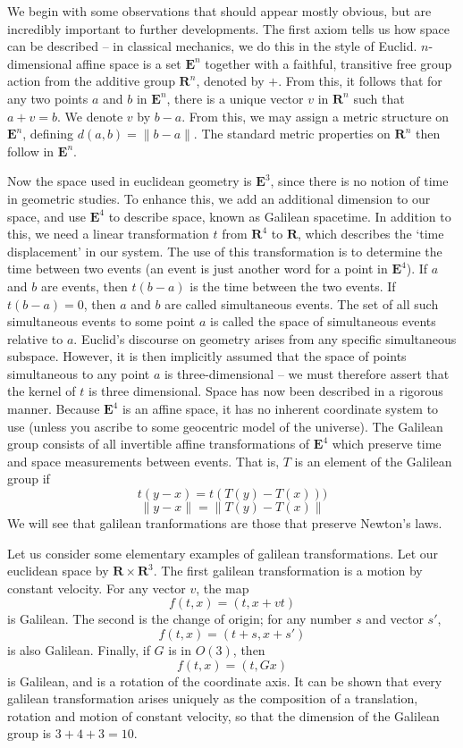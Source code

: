 We begin with some observations that should appear mostly obvious, but are incredibly important to further developments. The first axiom tells us how space can be described -- in classical mechanics, we do this in the style of Euclid. $n$-dimensional affine space is a set $\mathbf{E}^n$ together with a faithful, transitive free group action from the additive group $\mathbf{R}^n$, denoted by $+$. From this, it follows that for any two points $a$ and $b$ in $\mathbf{E}^n$, there is a unique vector $v$ in $\mathbf{R}^n$ such that $a + v = b$. We denote $v$ by $b - a$. From this, we may assign a metric structure on $\mathbf{E}^n$, defining $d(a,b) = \| b - a \|$. The standard metric properties on $\mathbf{R}^n$ then follow in $\mathbf{E}^n$.

Now the space used in euclidean geometry is $\mathbf{E}^3$, since there is no notion of time in geometric studies. To enhance this, we add an additional dimension to our space, and use $\mathbf{E}^4$ to describe space, known as Galilean spacetime. In addition to this, we need a linear transformation $t$ from $\mathbf{R}^4$ to $\mathbf{R}$, which describes the `time displacement' in our system. The use of this transformation is to determine the time between two events (an event is just another word for a point in $\mathbf{E}^4$). If $a$ and $b$ are events, then $t(b - a)$ is the time between the two events. If $t(b - a) = 0$, then $a$ and $b$ are called simultaneous events. The set of all such simultaneous events to some point $a$ is called the space of simultaneous events relative to $a$. Euclid's discourse on geometry arises from any specific simultaneous subspace. However, it is then implicitly assumed that the space of points simultaneous to any point $a$ is three-dimensional -- we must therefore assert that the kernel of $t$ is three dimensional. Space has now been described in a rigorous manner.
%
Because $\mathbf{E}^4$ is an affine space, it has no inherent coordinate system to use (unless you ascribe to some geocentric model of the universe). The Galilean group consists of all invertible affine transformations of $\mathbf{E}^4$ which preserve time and space measurements between events. That is, $T$ is an element of the Galilean group if
%
\[ t(y - x) = t(T(y) - T(x))) \]
%
\[ \| y - x \| = \| T(y) - T(x) \| \]
%
We will see that galilean tranformations are those that preserve Newton's laws.

Let us consider some elementary examples of galilean transformations. Let our euclidean space by $\mathbf{R} \times \mathbf{R}^3$. The first galilean transformation is a motion by constant velocity. For any vector $v$, the map
%
\[ f(t,x) = (t,x + vt) \]
%
is Galilean. The second is the change of origin; for any number $s$ and vector $s'$,
%
\[ f(t,x) = (t + s, x + s') \]
%
is also Galilean. Finally, if $G$ is in $O(3)$, then
%
\[ f(t,x) = (t, Gx) \]
%
is Galilean, and is a rotation of the coordinate axis. It can be shown that every galilean transformation arises uniquely as the composition of a translation, rotation and motion of constant velocity, so that the dimension of the Galilean group is $3 + 4 + 3 = 10$.


